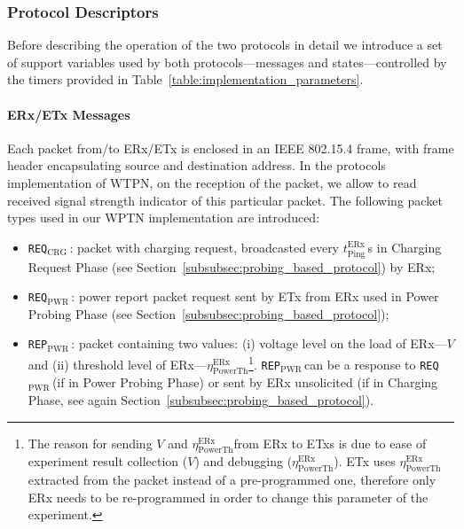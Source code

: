 \documentclass[11pt,draftclsnofoot,journal,onecolumn]{IEEEtran}
\newcommand{\textsubscript}[1]{$_{\text{#1}}$}
\newcommand{\rxDelayPing}{$t^\text{ERx}_\text{Ping}$}
\newcommand{\rxVoltageThreshold}{$\eta^\text{ERx}_\text{PowerTh}$}
\newcommand{\chargingRequest}{\texttt{REQ\textsubscript{CRG}}\,}
\newcommand{\powerProbeReport}{\texttt{REP\textsubscript{PWR}}\,}
\newcommand{\powerProbeRequest}{\texttt{REQ\textsubscript{PWR}}\,}
\begin{document}
\subsubsection{Protocol Descriptors}

Before describing the operation of the two protocols in detail we introduce a set of support variables used by both protocols---messages and states---controlled by the timers provided in Table~\ref{table:implementation_parameters}.

\paragraph{ERx/ETx Messages}
\label{sec:p1_msgs}

Each packet from/to ERx/ETx is enclosed in an IEEE 802.15.4 frame, with frame header encapsulating source and destination address. In the protocols implementation of WTPN, on the reception of the packet, we allow to read received signal strength indicator of this particular packet. The following packet types used in our WPTN implementation are introduced:

\begin{itemize}

\item \chargingRequest: packet with charging request, broadcasted every \rxDelayPing\,s in Charging Request Phase (see Section~\ref{subsubsec:probing_based_protocol}) by ERx;

\item \powerProbeRequest: power report packet request sent by ETx from ERx used in Power Probing Phase (see Section~\ref{subsubsec:probing_based_protocol});

\item \powerProbeReport: packet containing two values: (i) voltage level on the load of ERx---$V$ and (ii) threshold level of ERx---\rxVoltageThreshold\footnote{The reason for sending $V$ and \rxVoltageThreshold from ERx to ETxs is due to ease of experiment result collection ($V$) and debugging (\rxVoltageThreshold). ETx uses \rxVoltageThreshold extracted from the packet instead of a pre-programmed one, therefore only ERx needs to be re-programmed in order to change this parameter of the experiment.}. \powerProbeReport can be a response to \powerProbeRequest (if in Power Probing Phase) or sent by ERx unsolicited (if in Charging Phase, see again Section~\ref{subsubsec:probing_based_protocol}).

\end{itemize}
\end{document}
